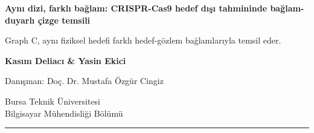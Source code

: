 \documentclass[final]{article}
\begin{document}
\pagecolor{PosterBg}
\color{Ink}

\begin{minipage}[b]{0.71\linewidth}
  \RaggedRight
  \relax
  {\fontsize{47}{53}\selectfont\bfseries\color{Ink}
  Aynı dizi, farklı bağlam: CRISPR-Cas9 hedef dışı tahmininde bağlam-duyarlı çizge temsili\par}
  \vspace{0.40cm}
  {\fontsize{22}{27}\selectfont\color{Muted}
  Graph C, aynı fiziksel hedefi farklı hedef-gözlem bağlamlarıyla temsil eder.\par}
\end{minipage}
\hfill
\begin{minipage}[b]{0.26\linewidth}
  \RaggedLeft
  {\fontsize{20}{24}\selectfont\bfseries\color{Ink}Kasım Deliacı \& Yasin Ekici\par}
  \vspace{0.18cm}
  {\fontsize{16}{20}\selectfont\color{Muted}Danışman: Doç. Dr. Mustafa Özgür Cingiz\par}
  \vspace{0.12cm}
  {\fontsize{16}{20}\selectfont\color{Muted}Bursa Teknik Üniversitesi\\Bilgisayar Mühendisliği Bölümü\par}
\end{minipage}

\vspace{0.5cm}
{\color{Ink}\rule{\linewidth}{2.6pt}}\par
\vspace{0.5cm}
\end{document}
